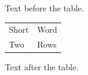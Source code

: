 \documentclass[12pt]{article}
\begin{document}
Text before the table.

\begin{tabular}{p{3cm}l}Short & Word\\Two & Rows\end{tabular}

Text after the table.
\end{document}
